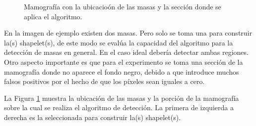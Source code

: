 \begin{figure}
	\caption{Mamografía con la ubicacioón de las masas y la sección donde se aplica el algoritmo.} \label{fig:example-mm-portion}
\end{figure}

En la imagen de ejemplo existen dos masas. Pero solo se toma una para construir la(s) shapelet(s), de este modo 
se evalúa la capacidad del algoritmo para la detección de masas en general. En el caso ideal debería detectar ambas
regiones. Otro aspecto importante es que para el experimento se toma una sección de la mamografía donde no aparece 
el fondo negro, debido a que introduce muchos falsos positivos por el hecho de que los píxeles sean iguales a
cero. 

La Figura \ref{fig:example-mm-portion} muestra la ubicación de las masas y la porción de la mamografía sobre
la cual se realiza el algoritmo de detección. La primera de izquierda a derecha es la seleccionada para construir
la(s) shapelet(s).

